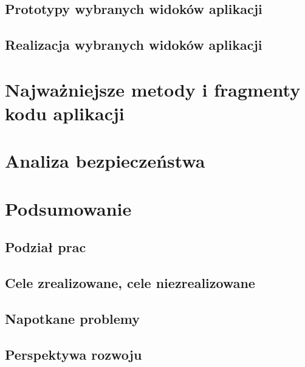 \documentclass[a4paper,12pt,numbers=noenddot]{scrreprt}
\begin{document}
\section{Prototypy wybranych widoków aplikacji}


\vspace{20em}
\section{Realizacja wybranych widoków aplikacji}






\chapter{Najważniejsze metody i fragmenty kodu aplikacji}




\chapter{Analiza bezpieczeństwa}

\chapter{Podsumowanie}
\section{Podział prac}


\section{Cele zrealizowane, cele niezrealizowane}


\section{Napotkane problemy}

\section{Perspektywa rozwoju}


%



\end{document}
